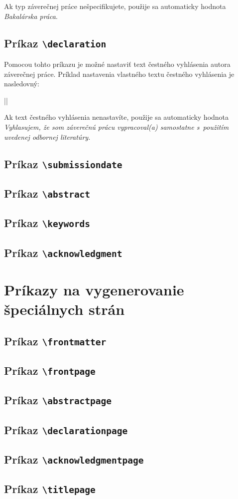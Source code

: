 Ak typ záverečnej práce nešpecifikujete, použije sa automaticky hodnota {\it Bakalárska práca}.


\subsection{Príkaz {\tt \textbackslash{}declaration}}

Pomocou tohto príkazu je možné nastaviť text čestného vyhlásenia autora záverečnej práce. Príklad nastavenia vlastného textu čestného vyhlásenia je nasledovný:

||

Ak text čestného vyhlásenia nenastavíte, použije sa automaticky hodnota {\it Vyhlasujem, že som záverečnú prácu vypracoval(a) samostatne s~použitím uvedenej odbornej literatúry.}


\subsection{Príkaz {\tt \textbackslash{}submissiondate}}
\subsection{Príkaz {\tt \textbackslash{}abstract}}
\subsection{Príkaz {\tt \textbackslash{}keywords}}
\subsection{Príkaz {\tt \textbackslash{}acknowledgment}}


\section{Príkazy na vygenerovanie špeciálnych strán}

\subsection{Príkaz {\tt \textbackslash{}frontmatter}}
\subsection{Príkaz {\tt \textbackslash{}frontpage}}
\subsection{Príkaz {\tt \textbackslash{}abstractpage}}
\subsection{Príkaz {\tt \textbackslash{}declarationpage}}
\subsection{Príkaz {\tt \textbackslash{}acknowledgmentpage}}
\subsection{Príkaz {\tt \textbackslash{}titlepage}}



